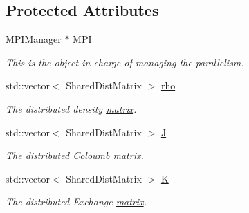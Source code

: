 \subsection*{Protected Attributes}
\begin{DoxyCompactItemize}
\item 
MPIManager $\ast$ \hyperlink{classJKBuilder_1_1DistributionCenter_a3753afd7c89e077643a274ed7c4e9129}{MPI}
\begin{DoxyCompactList}\small\item\em This is the object in charge of managing the parallelism. \item\end{DoxyCompactList}\item 
std::vector$<$ SharedDistMatrix $>$ \hyperlink{classJKBuilder_1_1DistributionCenter_aea5bfaa6247d7c03edf480fa8ecdd929}{rho}
\begin{DoxyCompactList}\small\item\em The distributed density \hyperlink{classJKBuilder_1_1matrix}{matrix}. \item\end{DoxyCompactList}\item 
std::vector$<$ SharedDistMatrix $>$ \hyperlink{classJKBuilder_1_1DistributionCenter_a83e7fc1320b7071187dce35322e659b2}{J}
\begin{DoxyCompactList}\small\item\em The distributed Coloumb \hyperlink{classJKBuilder_1_1matrix}{matrix}. \item\end{DoxyCompactList}\item 
std::vector$<$ SharedDistMatrix $>$ \hyperlink{classJKBuilder_1_1DistributionCenter_a36d7716ac07910f43805622922c1fb93}{K}
\begin{DoxyCompactList}\small\item\em The distributed Exchange \hyperlink{classJKBuilder_1_1matrix}{matrix}. \item\end{DoxyCompactList}\end{DoxyCompactItemize}
